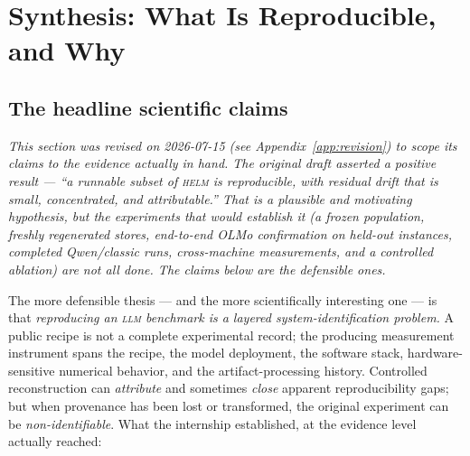 \documentclass[11pt]{report}
\begin{document}
\chapter{Synthesis: What Is Reproducible, and Why}
\label{chap:synthesis}

\section{The headline scientific claims}

\emph{This section was revised on 2026-07-15 (see Appendix~\ref{app:revision}) to
scope its claims to the evidence actually in hand. The original draft asserted a
positive result --- ``a runnable subset of \textsc{helm} \emph{is} reproducible,
with residual drift that is small, concentrated, and attributable.'' That is a
plausible and motivating \emph{hypothesis}, but the experiments that would
establish it (a frozen population, freshly regenerated stores, end-to-end OLMo
confirmation on held-out instances, completed Qwen/classic runs, cross-machine
measurements, and a controlled ablation) are not all done. The claims below are the
defensible ones.}

\medskip
The more defensible thesis --- and the more scientifically interesting one --- is
that \emph{reproducing an \textsc{llm} benchmark is a layered system-identification
problem.} A public recipe is not a complete experimental record; the producing
measurement instrument spans the recipe, the model deployment, the software stack,
hardware-sensitive numerical behavior, and the artifact-processing history.
Controlled reconstruction can \emph{attribute} and sometimes \emph{close} apparent
reproducibility gaps; but when provenance has been lost or transformed, the original
experiment can be \emph{non-identifiable}. What the internship established, at the
evidence level actually reached:
\end{document}
